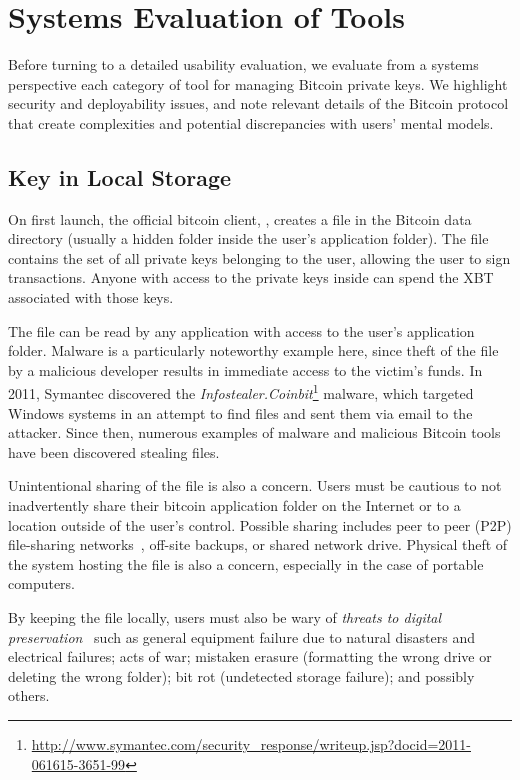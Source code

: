 
\section{Systems Evaluation of Tools} 

Before turning to a detailed usability evaluation, we evaluate from a systems perspective each category of tool for managing Bitcoin private keys. We highlight security and deployability issues, and note relevant details of the Bitcoin protocol that create complexities and potential discrepancies with users' mental models.

\subsection{Key in Local Storage}
On first launch, the official bitcoin client, \bitcoinclient, creates a \walletfile file in the Bitcoin data directory (usually a hidden folder inside the user's application folder). The \walletfile file contains the set of all private keys belonging to the user, allowing the user to sign transactions. Anyone with access to the private keys inside \walletfile can spend the XBT associated with those keys.

The \walletfile file can be read by any application with access to the user's application folder. Malware is a particularly noteworthy example here, since theft of the \walletfile file by a malicious developer results in immediate access to the victim's funds. In 2011, Symantec discovered the \textit{Infostealer.Coinbit}\footnote{\url{http://www.symantec.com/security_response/writeup.jsp?docid=2011-061615-3651-99}} malware, which targeted Windows systems in an attempt to find \walletfile files and sent them via email to the attacker. Since then, numerous examples of malware and malicious Bitcoin tools have been discovered stealing \walletfile files. 

Unintentional sharing of the \walletfile file is also a concern. Users must be cautious to not inadvertently share their bitcoin application folder on the Internet or to a location outside of the user's control. Possible sharing includes peer to peer (P2P) file-sharing networks~\cite{}, off-site backups, or shared network drive. Physical theft of the system hosting the \walletfile file is also a concern, especially in the case of portable computers.

By keeping the \walletfile file locally, users must also be wary of \textit{threats to digital preservation}~\cite{BKM05} such as general equipment failure due to natural disasters and electrical failures; acts of war; mistaken erasure (\eg formatting the wrong drive or deleting the wrong folder); bit rot (\ie undetected storage failure); and possibly others. 

